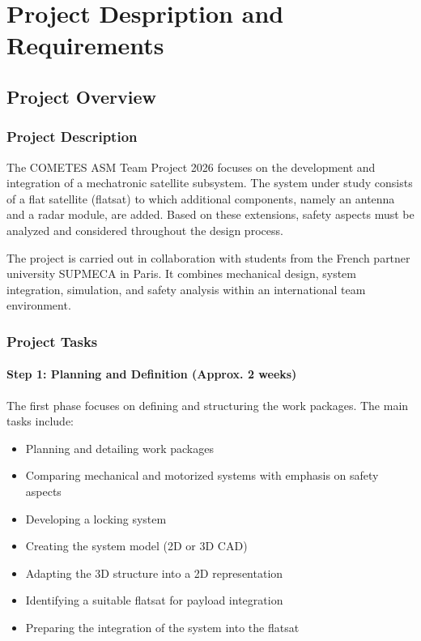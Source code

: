 \chapter{Project Despription and Requirements}
\label{ch:project-description-and-requirements}
\section{Project Overview}
\subsection{Project Description}
The COMETES ASM Team Project 2026 focuses on the development and integration of a mechatronic satellite subsystem. 
The system under study consists of a flat satellite (flatsat) to which additional components, namely an antenna and a radar module, 
are added. Based on these extensions, safety aspects must be analyzed and considered throughout the design process.

The project is carried out in collaboration with students from the French partner university SUPMECA in Paris. 
It combines mechanical design, system integration, simulation, and safety analysis within an international team environment.

\subsection{Project Tasks}

\subsubsection*{Step 1: Planning and Definition (Approx. 2 weeks)}
The first phase focuses on defining and structuring the work packages. The main tasks include:
\begin{itemize}
	\item Planning and detailing work packages
	\item Comparing mechanical and motorized systems with emphasis on safety aspects
	\item Developing a locking system
	\item Creating the system model (2D or 3D CAD)
	\item Adapting the 3D structure into a 2D representation
	\item Identifying a suitable flatsat for payload integration
	\item Preparing the integration of the system into the flatsat
\end{itemize}

